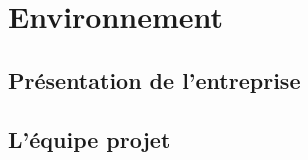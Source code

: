 \chapter{Environnement}
\minitoc

    \section{Présentation de l'entreprise}
    \section{L'équipe projet}